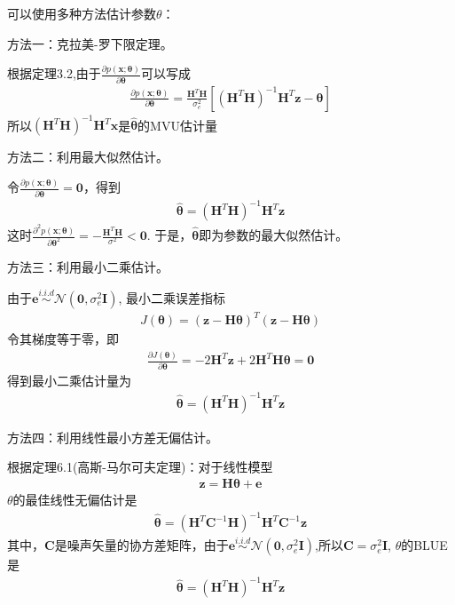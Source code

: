 \documentclass[fontset=windows]{article}
\numberwithin{figure}{section}
\begin{document}
可以使用多种方法估计参数\(\theta\)：

方法一：克拉美-罗下限定理。

根据定理3.2,由于\(\frac{\partial p(\mathbf{x};\boldsymbol{\theta})}{\partial \boldsymbol{\theta}}\)可以写成
\begin{align*}
	\frac{\partial p(\mathbf{x};\boldsymbol{\theta})}{\partial \boldsymbol{\theta}}
	=\frac{\mathbf{H}^T\mathbf{H}}{\sigma_e^2}[(\mathbf{H}^T\mathbf{H})^{-1}\mathbf{H}^T\mathbf{z}-\boldsymbol{\theta}]
\end{align*}
所以\((\mathbf{H}^T\mathbf{H})^{-1}\mathbf{H}^T\mathbf{x}\)是\(\hat{\boldsymbol{\theta}}\)的MVU估计量


方法二：利用最大似然估计。

令\(\frac{\partial p(\mathbf{x};\boldsymbol{\theta})}{\partial \boldsymbol{\theta}}=\mathbf{0}\)，得到
\begin{align*}
	\hat{\boldsymbol{\theta}}=(\mathbf{H}^T\mathbf{H})^{-1}\mathbf{H}^T\mathbf{z}
\end{align*}
这时\(\frac{\partial^2 p(\mathbf{x};\boldsymbol{\theta})}{\partial \boldsymbol{\theta}^2}=
-\frac{\mathbf{H}^T\mathbf{H}}{\sigma^2}< \mathbf{0}\).
于是，\(\hat{\boldsymbol{\theta}}\)即为参数的最大似然估计。

方法三：利用最小二乘估计。

由于\(\mathbf{e}\overset{i.i.d}{\sim}\mathcal{N}(\mathbf{0},\sigma^2_e \mathbf{I})\),
最小二乘误差指标
\begin{align*}
	J(\mathbf{\boldsymbol{\theta}})=(\mathbf{z}-\mathbf{H}\boldsymbol{\theta})^T
	(\mathbf{z}-\mathbf{H}\boldsymbol{\theta})
\end{align*}
令其梯度等于零，即
\begin{align*}
	\frac{\partial J(\boldsymbol{\theta})}{\partial \boldsymbol{\theta}}
	=-2\mathbf{H}^T \mathbf{z}+2\mathbf{H}^T \mathbf{H}\boldsymbol{\theta}=\mathbf{0}
\end{align*}
得到最小二乘估计量为
\begin{align*}
	\hat{\boldsymbol{\theta}}=(\mathbf{H}^T\mathbf{H})^{-1}\mathbf{H}^T\mathbf{z}
\end{align*}

方法四：利用线性最小方差无偏估计。

根据定理6.1(高斯-马尔可夫定理)：对于线性模型
\begin{align*}
	\mathbf{z}=\mathbf{H}\boldsymbol{\theta}+\mathbf{e}
\end{align*}
\(\theta\)的最佳线性无偏估计是
\begin{align*}
	\hat{\boldsymbol{\theta}}=(\mathbf{H}^T \mathbf{C}^{-1}\mathbf{H})^{-1}\mathbf{H}^T
	\mathbf{C}^{-1}\mathbf{z}
\end{align*}
其中，\(\mathbf{C}\)是噪声矢量的协方差矩阵，由于\(\mathbf{e}\overset{i.i.d}{\sim}
\mathcal{N}(\mathbf{0},\sigma^2_e \mathbf{I})\),所以\(\mathbf{C}=\sigma_e^2 \mathbf{I}\),
\(\theta\)的BLUE是
\begin{align*}
	\hat{\boldsymbol{\theta}}=(\mathbf{H}^T \mathbf{H})^{-1}\mathbf{H}^T\mathbf{z}
\end{align*}
\end{document}

